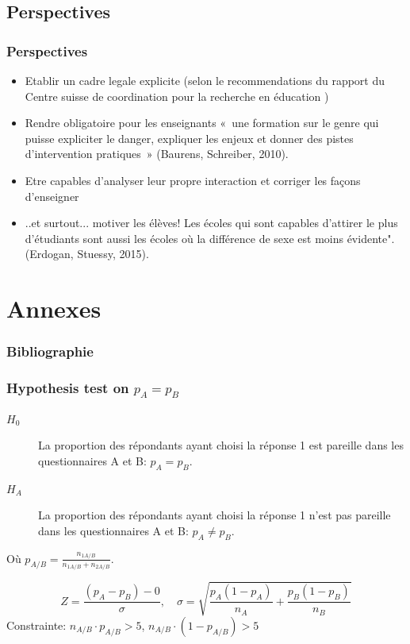 \documentclass{beamer}
\begin{document}
\subsection{Perspectives}
\begin{frame}
  \frametitle{Perspectives}
  \begin{itemize}
  \item Etablir un cadre legale explicite (selon le recommendations du rapport du Centre suisse de coordination pour la recherche en éducation )
  \item Rendre obligatoire pour les enseignants « une formation sur le genre qui puisse expliciter le danger, expliquer les enjeux  et donner des pistes d’intervention pratiques » (Baurens, Schreiber, 2010). 
  \item Etre capables d’analyser leur propre interaction et corriger les façons d’enseigner 
  \item ..et surtout... motiver les élèves!  Les écoles qui sont capables d’attirer le plus d’étudiants sont aussi les écoles où la différence de sexe est  moins évidente". (Erdogan, Stuessy, 2015). 	  
  \end{itemize}
\end{frame}

\section{Annexes}
\begin{frame}
\frametitle{Bibliographie}
\end{frame}

\begin{frame}
  \frametitle{Hypothesis test on $p_A = p_B $}
  \begin{description}
  \item[$H_0$] La proportion des répondants ayant choisi la réponse 1 est
                pareille dans les questionnaires A et B: $p_A = p_B$. 
  \item[$H_A$] La proportion des répondants ayant choisi la réponse
                1 n’est pas  pareille dans les questionnaires A et B: $p_A \ne p_B$.
  \end{description}
  Où $p_{A/B}  = \frac{n_{1A/B}}{n_{1A/B}  + n_{2A/B}}$.

  \[
  Z = \frac{(p_A-p_B) - 0}{\sigma} ,\quad
  \sigma = \sqrt{\frac{p_A(1-p_A)}{n_A} + \frac{p_B(1-p_B)}{n_B}} 
  \]
  Constrainte: $n_{A/B} \cdot p_{A/B} > 5$, $n_{A/B} \cdot (1-p_{A/B}) > 5$ 
\end{frame}
\end{document}
